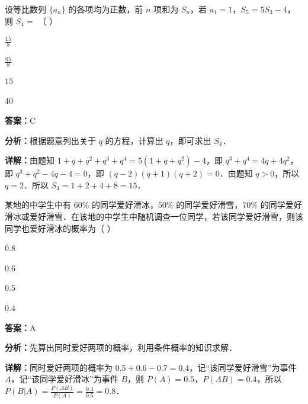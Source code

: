 \begin{question}[points=5]
设等比数列 $\{a_n\}$ 的各项均为正数，前 $n$ 项和为 $S_n$，若 $a_1 = 1$，$S_5 = 5S_3 - 4$，则 $S_4 = $ （                         ）
\begin{choices}
  \item $\frac{15}{8}$
  \item $\frac{65}{8}$
  \item $15$
  \item $40$
\end{choices}
\begin{solution}
\textbf{答案：}C

\textbf{分析：}根据题意列出关于 $q$ 的方程，计算出 $q$，即可求出 $S_4$．

\textbf{详解：}由题知 $1 + q + q^2 + q^3 + q^4 = 5(1 + q + q^2) - 4$，即 $q^3 + q^4 = 4q + 4q^2$，即 $q^3 + q^2 - 4q - 4 = 0$，即 $(q - 2)(q + 1)(q + 2) = 0$．由题知 $q > 0$，所以 $q = 2$．所以 $S_4 = 1 + 2 + 4 + 8 = 15$．
\end{solution}
\end{question}

\begin{question}[points=5]
某地的中学生中有 $60\%$ 的同学爱好滑冰，$50\%$ 的同学爱好滑雪，$70\%$ 的同学爱好滑冰或爱好滑雪．在该地的中学生中随机调查一位同学，若该同学爱好滑雪，则该同学也爱好滑冰的概率为（                                                        ）
\begin{choices}
  \item $0.8$
  \item $0.6$
  \item $0.5$
  \item $0.4$
\end{choices}
\begin{solution}
\textbf{答案：}A

\textbf{分析：}先算出同时爱好两项的概率，利用条件概率的知识求解．

\textbf{详解：}同时爱好两项的概率为 $0.5 + 0.6 - 0.7 = 0.4$，记“该同学爱好滑雪”为事件 $A$，记“该同学爱好滑冰”为事件 $B$，则 $P(A)=0.5$，$P(AB)=0.4$，所以 $P(B|A) = \frac{P(AB)}{P(A)} = \frac{0.4}{0.5} = 0.8$．
\end{solution}
\end{question}

